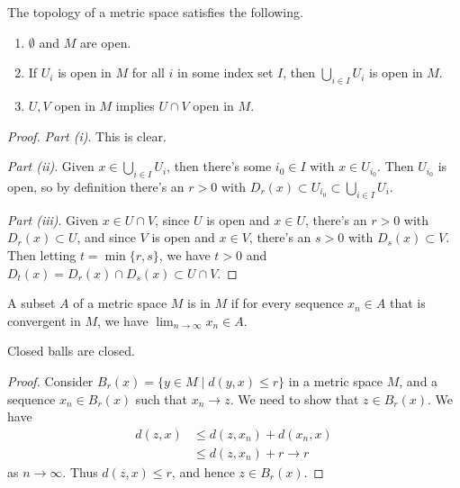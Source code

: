 \begin{proposition}
    The topology of a metric space satisfies the following.
    \begin{enumerate}[label=(\roman*)]
        \item $\emptyset$ and $M$ are open.
        \item If $U_i$ is open in $M$ for all $i$ in some index set $I$, then $\bigcup_{i \in I} U_i$ is open in $M$.
        \item $U, V$ open in $M$ implies $U \cap V$ open in $M$.
    \end{enumerate}
\end{proposition}
\begin{proof}
    \emph{Part (i)}. This is clear.

    \emph{Part (ii)}. Given $x \in \bigcup_{i \in I} U_i$, then there's some $i_0 \in I$ with $x \in U_{i_0}$. Then $U_{i_0}$ is open, so by definition there's an $r > 0$ with $D_r(x) \subset U_{i_0} \subset \bigcup_{i \in I} U_i$.

    \emph{Part (iii)}. Given $x \in U \cap V$, since $U$ is open and $x \in U$, there's an $r > 0$ with $D_r(x) \subset U$, and since $V$ is open and $x \in V$, there's an $s > 0$ with $D_s(x) \subset V$. Then letting $t = \min\{r, s\}$, we have $t >0$ and $D_t(x) = D_r(x) \cap D_s(x) \subset U \cap V$.
\end{proof}

\begin{definition}[Closed]
    A subset $A$ of a metric space $M$ is  in $M$ if for every sequence $x_n \in A$ that is convergent in $M$, we have $\lim_{n \to \infty} x_n \in A$.
\end{definition}

\begin{lemma}
    Closed balls are closed.
\end{lemma}
\begin{proof}
    Consider $B_r(x) = \{y \in M \mid d(y, x) \leq r\}$ in a metric space $M$, and a sequence $x_n \in B_r(x)$ such that $x_n \rightarrow z$. We need to show that $z \in B_r(x)$. We have
    \begin{align*}
        d(z, x) &\leq d(z, x_n) + d(x_n, x) \\
            &\leq d(z, x_n) + r \rightarrow r
    \end{align*}
    as $n \rightarrow \infty$. Thus $d(z, x) \leq r$, and hence $z \in B_r(x)$.
\end{proof}

